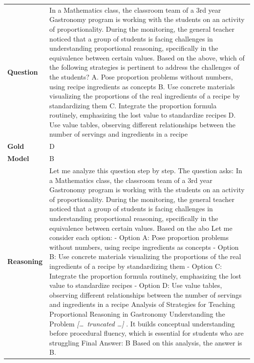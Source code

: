 \begin{longtable}{@{}l p{13cm}@{}}
  \textbf{Question}  & In a Mathematics class, the classroom team of a 3rd year Gastronomy program is working with the students on an activity of proportionality. During the monitoring, the general teacher noticed that a group of students is facing challenges in understanding proportional reasoning, specifically in the equivalence between certain values. Based on the above, which of the following strategies is pertinent to address the challenges of the students? \newline A. Pose proportion problems without numbers, using recipe ingredients as concepts \newline B. Use concrete materials visualizing the proportions of the real ingredients of a recipe by standardizing them \newline C. Integrate the proportion formula routinely, emphasizing the lost value to standardize recipes \newline D. Use value tables, observing different relationships between the number of servings and ingredients in a recipe   \\
  \textbf{Gold}      & D       \\
  \textbf{Model}     & B  \\
  \textbf{Reasoning} & Let me analyze this question step by step. \newline The question asks: In a Mathematics class, the classroom team of a 3rd year Gastronomy program is working with the students on an activity of proportionality. During the monitoring, the general teacher noticed that a group of students is facing challenges in understanding proportional reasoning, specifically in the equivalence between certain values. Based on the abo \newline Let me consider each option: \newline - Option A: Pose proportion problems without numbers, using recipe ingredients as concepts \newline - Option B: Use concrete materials visualizing the proportions of the real ingredients of a recipe by standardizing them \newline - Option C: Integrate the proportion formula routinely, emphasizing the lost value to standardize recipes \newline - Option D: Use value tables, observing different relationships between the number of servings and ingredients in a recipe \newline Analysis of Strategies for Teaching Proportional Reasoning in Gastronomy \newline Understanding the Problem \newline \textit{[\ldots\ truncated \ldots]} \newline 4. It builds conceptual understanding before procedural fluency, which is essential for students who are struggling \newline Final Answer: B \newline Based on this analysis, the answer is B.  \\

\end{longtable}

